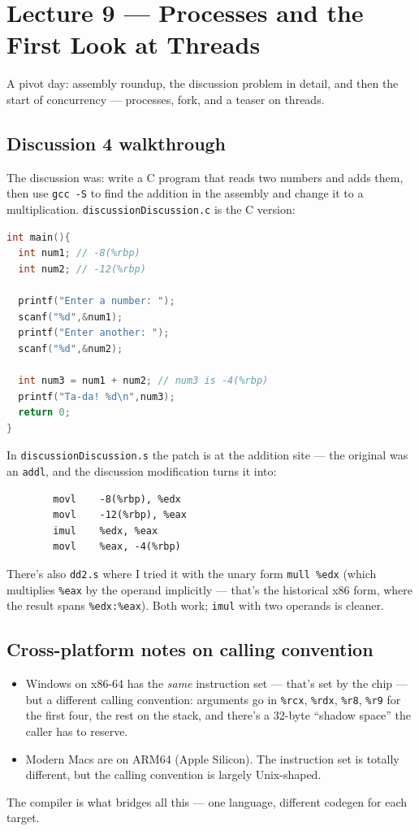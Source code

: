 \documentclass[11pt]{article}
\begin{document}
\section{Lecture 9 --- Processes and the First Look at Threads}

A pivot day: assembly roundup, the discussion problem in detail,
and then the start of concurrency --- processes, fork, and a teaser
on threads.

\subsection*{Discussion 4 walkthrough}

The discussion was: write a C program that reads two numbers and
adds them, then use \texttt{gcc -S} to find the addition in the
assembly and change it to a multiplication. \texttt{discussionDiscussion.c}
is the C version:

\begin{lstlisting}[language=C]
int main(){
  int num1; // -8(%rbp)
  int num2; // -12(%rbp)

  printf("Enter a number: ");
  scanf("%d",&num1);
  printf("Enter another: ");
  scanf("%d",&num2);

  int num3 = num1 + num2; // num3 is -4(%rbp)
  printf("Ta-da! %d\n",num3);
  return 0;
}
\end{lstlisting}

In \texttt{discussionDiscussion.s} the patch is at the addition
site --- the original was an \texttt{addl}, and the discussion
modification turns it into:

\begin{lstlisting}
        movl    -8(%rbp), %edx
        movl    -12(%rbp), %eax
        imul    %edx, %eax
        movl    %eax, -4(%rbp)
\end{lstlisting}

There's also \texttt{dd2.s} where I tried it with the unary form
\texttt{mull \%edx} (which multiplies \texttt{\%eax} by the operand
implicitly --- that's the historical x86 form, where the result
spans \texttt{\%edx:\%eax}). Both work; \texttt{imul} with two
operands is cleaner.

\subsection*{Cross-platform notes on calling convention}

\begin{itemize}
  \item Windows on x86-64 has the \emph{same} instruction set ---
    that's set by the chip --- but a different calling convention:
    arguments go in \texttt{\%rcx}, \texttt{\%rdx}, \texttt{\%r8},
    \texttt{\%r9} for the first four, the rest on the stack, and
    there's a 32-byte ``shadow space'' the caller has to reserve.
  \item Modern Macs are on ARM64 (Apple Silicon). The instruction
    set is totally different, but the calling convention is largely
    Unix-shaped.
\end{itemize}
The compiler is what bridges all this --- one language, different
codegen for each target.
\end{document}
